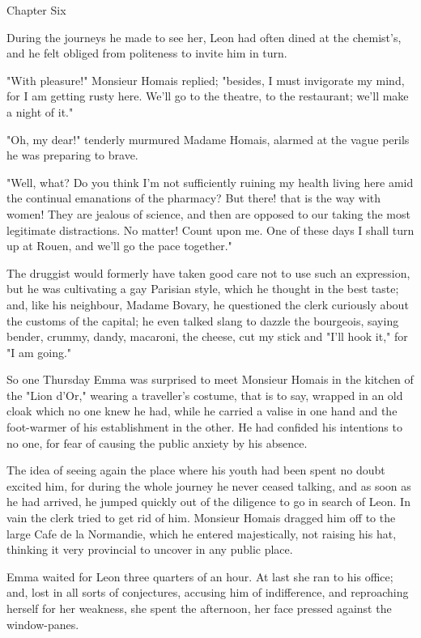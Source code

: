 \documentclass[11pt,twocolumn]{ltugboat}
\begin{document}
Chapter Six

During the journeys he made to see her, Leon had often dined at the
chemist's, and he felt obliged from politeness to invite him in turn.

"With pleasure!" Monsieur Homais replied; "besides, I must invigorate
my mind, for I am getting rusty here. We'll go to the theatre, to the
restaurant; we'll make a night of it."

"Oh, my dear!" tenderly murmured Madame Homais, alarmed at the vague
perils he was preparing to brave.

"Well, what? Do you think I'm not sufficiently ruining my health living
here amid the continual emanations of the pharmacy? But there! that is
the way with women! They are jealous of science, and then are opposed to
our taking the most legitimate distractions. No matter! Count upon
me. One of these days I shall turn up at Rouen, and we'll go the pace
together."

The druggist would formerly have taken good care not to use such an
expression, but he was cultivating a gay Parisian style, which he
thought in the best taste; and, like his neighbour, Madame Bovary, he
questioned the clerk curiously about the customs of the capital; he
even talked slang to dazzle the bourgeois, saying bender, crummy, dandy,
macaroni, the cheese, cut my stick and "I'll hook it," for "I am going."

So one Thursday Emma was surprised to meet Monsieur Homais in the
kitchen of the "Lion d'Or," wearing a traveller's costume, that is to
say, wrapped in an old cloak which no one knew he had, while he carried
a valise in one hand and the foot-warmer of his establishment in the
other. He had confided his intentions to no one, for fear of causing the
public anxiety by his absence.

The idea of seeing again the place where his youth had been spent no
doubt excited him, for during the whole journey he never ceased talking,
and as soon as he had arrived, he jumped quickly out of the diligence
to go in search of Leon. In vain the clerk tried to get rid of him.
Monsieur Homais dragged him off to the large Cafe de la Normandie,
which he entered majestically, not raising his hat, thinking it very
provincial to uncover in any public place.

Emma waited for Leon three quarters of an hour. At last she ran to
his office; and, lost in all sorts of conjectures, accusing him of
indifference, and reproaching herself for her weakness, she spent the
afternoon, her face pressed against the window-panes.
\end{document}

